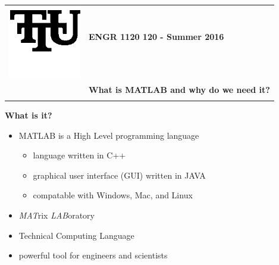 \documentclass[11pt]{article}
\begin{document}
\begin{tabular}{ l l }
  \multirow{2}{*}{\includegraphics[height=1.25in,width=1.25in]{ttu_logo.png}} & \textbf{ \LARGE ENGR 1120 120 - Summer 2016} \\\\
  & \textbf{\LARGE What is MATLAB and why do we need it?} \\\\
\end{tabular}

\vspace{10mm}

	\textbf{\Large What is it?}
	\begin{itemize}
		\item MATLAB is a High Level programming language
		\begin{itemize}
			\item language written in C++
			\item graphical user interface (GUI) written in JAVA 
			\item compatable with Windows, Mac, and Linux
		\end{itemize}
		\item {\it MAT}rix {\it LAB}oratory
		\item Technical Computing Language
		\item powerful tool for engineers and scientists
	\end{itemize}	
\end{document}
